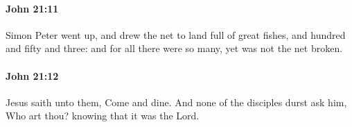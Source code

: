 		\paragraph{John 21:11} %
			\label{JOHN-21-11}

			Simon Peter went up, and drew the net to land full of great fishes, and hundred and fifty and three: and for all there were so many, yet was not the net broken.

			\begin{framed}
				\scriptsize
				\begin{compactdesc}
					\item[SBLG] 
				\end{compactdesc}
			\end{framed}

		\paragraph{John 21:12} %
			\label{JOHN-21-12}

			Jesus saith unto them, Come and dine. And none of the disciples durst ask him, Who art thou? knowing that it was the Lord.

